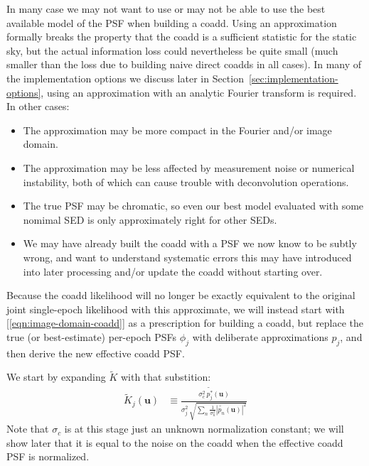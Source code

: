 \documentclass[DM,authoryear,toc]{lsstdoc}
\begin{document}
In many case we may not want to use or may not be able to use the best available model of the PSF when building a coadd.
Using an approximation formally breaks the property that the coadd is a sufficient statistic for the static sky, but the actual information loss could nevertheless be quite small (much smaller than the loss due to building naive direct coadds in all cases).
In many of the implementation options we discuss later in Section~\ref{sec:implementation-options}, using an approximation with an analytic Fourier transform is required.
In other cases:
\begin{itemize}
    \item The approximation may be more compact in the Fourier and/or image domain.
    \item The approximation may be less affected by measurement noise or numerical instability, both of which can cause trouble with deconvolution operations.
    \item The true PSF may be chromatic, so even our best model evaluated with some nomimal SED is only approximately right for other SEDs.
    \item We may have already built the coadd with a PSF we now know to be subtly wrong, and want to understand systematic errors this may have introduced into later processing and/or update the coadd without starting over.
\end{itemize}

Because the coadd likelihood will no longer be exactly equivalent to the original joint single-epoch likelihood with this approximate, we will instead start with [\ref{eqn:image-domain-coadd}] as a prescription for building a coadd, but replace the true (or best-estimate) per-epoch PSFs $\phi_j$ with deliberate approximations $p_j$, and then derive the new effective coadd PSF.

We start by expanding $\widetilde{K}$ with that substition:
\begin{align}
    \widetilde{K}_j(\symbf{u}) &\equiv
        \frac{
            \sigma_c^2\, \widetilde{p_j^\ast}(\symbf{u})
        }{
            \sigma_j^2 \, \sqrt{\sum\limits_n \frac{1}{\sigma_n^2}\left|\widetilde{p_n}(\symbf{u})\right|^2}
        }
    \label{eqn:adjusted-k}
\end{align}
Note that $\sigma_c$ is at this stage just an unknown normalization constant; we will show later that it is equal to the noise on the coadd when the effective coadd PSF is normalized.
\end{document}

